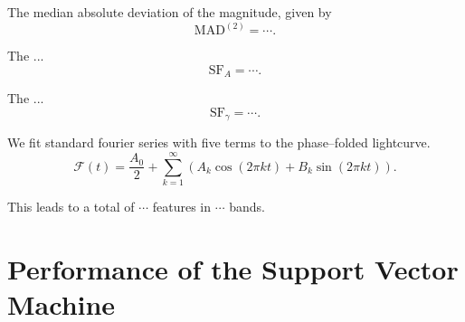 \begin{enumerate}
 The median absolute deviation of the magnitude, given by
\begin{equation}\text{MAD}^{(2)} = \cdots.\end{equation}

 The ...
\begin{equation}\text{SF}_A = \cdots.\end{equation}

 The ...
\begin{equation}\text{SF}_\gamma = \cdots.\end{equation}

 We fit standard fourier series with five terms to the phase--folded lightcurve.
\begin{equation}\mathcal{F}(t) = \frac{A_0}{2} + \sum_{k=1}^{\infty} ( A_k \cos(2 \pi k t) + B_k \sin(2 \pi k t) ).\end{equation}



\end{enumerate}

This leads to a total of $\cdots$ features in $\cdots$ bands.


\section{Performance of the Support Vector Machine}


